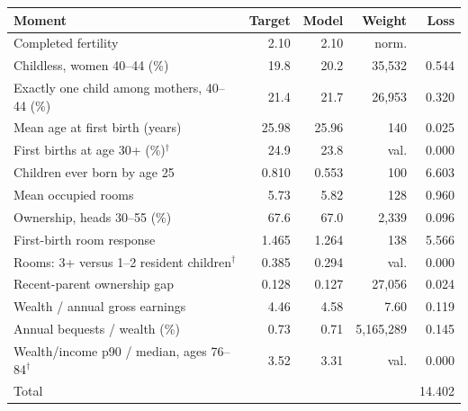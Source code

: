 \begin{tabularx}{\textwidth}{@{}Xrrrr@{}}
\toprule
Moment & Target & Model & Weight & Loss \\
\midrule
Completed fertility & 2.10 & 2.10 & norm. &  \\
Childless, women 40--44 (\%) & 19.8 & 20.2 & 35,532 & 0.544 \\
Exactly one child among mothers, 40--44 (\%) & 21.4 & 21.7 & 26,953 & 0.320 \\
Mean age at first birth (years) & 25.98 & 25.96 & 140 & 0.025 \\
First births at age 30+ (\%)$^{\dagger}$ & 24.9 & 23.8 & val. & 0.000 \\
Children ever born by age 25 & 0.810 & 0.553 & 100 & 6.603 \\
\addlinespace[4pt]
Mean occupied rooms & 5.73 & 5.82 & 128 & 0.960 \\
Ownership, heads 30--55 (\%) & 67.6 & 67.0 & 2,339 & 0.096 \\
First-birth room response & 1.465 & 1.264 & 138 & 5.566 \\
Rooms: 3+ versus 1--2 resident children$^{\dagger}$ & 0.385 & 0.294 & val. & 0.000 \\
Recent-parent ownership gap & 0.128 & 0.127 & 27,056 & 0.024 \\
\addlinespace[4pt]
Wealth / annual gross earnings & 4.46 & 4.58 & 7.60 & 0.119 \\
Annual bequests / wealth (\%) & 0.73 & 0.71 & 5,165,289 & 0.145 \\
Wealth/income p90 / median, ages 76--84$^{\dagger}$ & 3.52 & 3.31 & val. & 0.000 \\
\midrule
Total & & & & 14.402 \\
\bottomrule
\end{tabularx}
